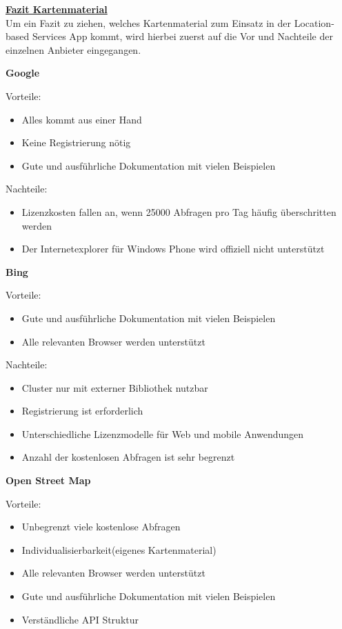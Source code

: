 \textbf{\underline{Fazit Kartenmaterial}}\\
Um ein Fazit zu ziehen, welches Kartenmaterial zum Einsatz in der Location-based Services App kommt, wird hierbei zuerst auf die Vor und Nachteile der einzelnen Anbieter eingegangen.

\textbf{Google}

Vorteile:
\begin{itemize}
\item Alles kommt aus einer Hand
\item Keine Registrierung nötig
\item Gute und ausführliche Dokumentation mit vielen Beispielen
\end{itemize}

Nachteile:
\begin{itemize}
\item Lizenzkosten fallen an, wenn 25000 Abfragen pro Tag häufig überschritten werden
\item Der Internetexplorer für Windows Phone wird offiziell nicht unterstützt
\end{itemize}


\textbf{Bing}

Vorteile:
\begin{itemize}
\item Gute und ausführliche Dokumentation mit vielen Beispielen
\item Alle relevanten Browser werden unterstützt
\end{itemize}

Nachteile:
\begin{itemize}
\item Cluster nur mit externer Bibliothek nutzbar
\item Registrierung ist erforderlich 
\item Unterschiedliche Lizenzmodelle für Web und mobile Anwendungen
\item Anzahl der kostenlosen Abfragen ist sehr begrenzt
\end{itemize}


\textbf{Open Street Map}

Vorteile:
\begin{itemize}
\item Unbegrenzt viele kostenlose Abfragen
\item Individualisierbarkeit(eigenes Kartenmaterial)
\item Alle relevanten Browser werden unterstützt
\item Gute und ausführliche Dokumentation mit vielen Beispielen
\item Verständliche API Struktur
\end{itemize}

